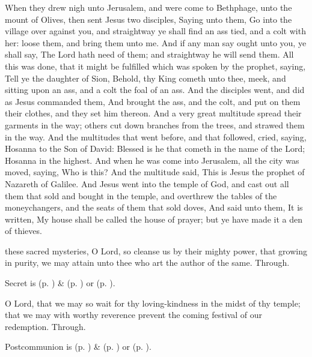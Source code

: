  When they drew nigh unto Jerusalem, and were come to Bethphage, unto the mount of Olives, then sent Jesus two disciples, Saying unto them, Go into the village over against you, and straightway ye shall find an ass tied, and a colt with her: loose them, and bring them unto me. And if any man say ought unto you, ye shall say, The Lord hath need of them; and straightway he will send them. All this was done, that it might be fulfilled which was spoken by the prophet, saying, Tell ye the daughter of Sion, Behold, thy King cometh unto thee, meek, and sitting upon an ass, and a colt the foal of an ass. And the disciples went, and did as Jesus commanded them, And brought the ass, and the colt, and put on them their clothes, and they set him thereon. And a very great multitude spread their garments in the way; others cut down branches from the trees, and strawed them in the way. And the multitudes that went before, and that followed, cried, saying, Hosanna to the Son of David: Blessed is he that cometh in the name of the Lord; Hosanna in the highest. And when he was come into Jerusalem, all the city was moved, saying, Who is this? And the multitude said, This is Jesus the prophet of Nazareth of Galilee. And Jesus went into the temple of God, and cast out all them that sold and bought in the temple, and overthrew the tables of the moneychangers, and the seats of them that sold doves, And said unto them, It is written, My house shall be called the house of prayer; but ye have made it a den of thieves.


\secret\label{AdventISecret}
 these sacred mysteries, O Lord, so cleanse us by their mighty power, that growing in purity, we may attain unto thee who art the author of the same. Through.
\begin{rubric}
     Secret is  (p. \pageref{SPMaryInAdvent}) \&   (p. \pageref{SPAgainst}) or  (p. \pageref{SPChiefBishop}).
\end{rubric}
\postcommunion\label{AdventIPostcommunion}
 O Lord, that we may so wait for thy loving-kindness in the midst of thy temple; that we may with worthy reverence prevent the coming festival of our redemption. Through.
\begin{rubric}
     Postcommunion is  (p. \pageref{SPMaryInAdvent}) \&   (p. \pageref{SPAgainst}) or  (p. \pageref{SPChiefBishop}).
\end{rubric}

